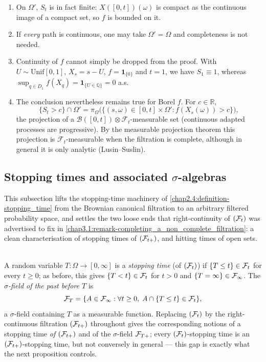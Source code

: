 \begin{remark}
\leavevmode
\begin{enumerate}
  \item On $\Omega'$, $S_t$ is in fact finite: $X([0,t])(\omega)$ is compact as
        the continuous image of a compact set, so $f$ is bounded on it.
  \item If \emph{every} path is continuous, one may take $\Omega'=\Omega$ and
        completeness is not needed.
  \item Continuity of $f$ cannot simply be dropped from the proof.
        With $U\sim\mathrm{Unif}[0,1]$, $X_s=s-U$, $f=\mathbf 1_{\{0\}}$ and
        $t=1$, we have $S_1\equiv 1$, whereas
        $\sup_{q\in D_1}f(X_q)=\mathbf 1_{\{U\in\mathbb Q\}}=0$ a.s.
  \item The conclusion nevertheless remains true for Borel $f$. For
        $c\in\mathbb R$,
        \[
          \{S_t>c\}\cap\Omega'
          =\pi_\Omega\bigl(\{(s,\omega)\in[0,t]\times\Omega' :
             f(X_s(\omega))>c\}\bigr),
        \]
        the projection of a $\mathcal B([0,t])\otimes\mathcal F_t$-measurable
        set (continuous adapted processes are progressive). By the measurable
        projection theorem this projection is $\mathcal F_t$-measurable when the
        filtration is complete, although in general it is only analytic
        (Lusin--Suslin).
\end{enumerate}
\end{remark}

\subsection{Stopping times and associated \texorpdfstring{$\sigma$}{sigma}-algebras}
This subsection lifts the stopping-time machinery of \cref{chap2.4:definition-stopping_time} from the Brownian canonical filtration to an arbitrary filtered probability space, and settles the two loose ends that right-continuity of $(\mathcal{F}_t)$ was advertised to fix in \cref{chap3.1:remark-completing_a_non_complete_filtration}: a clean characterisation of stopping times of $(\mathcal{F}_{t+})$, and hitting times of open sets.

\begin{definition} \label{chap3.2:definition-stopping_time}  \\
A random variable $T:\Omega\to[0,\infty]$ is a \textit{stopping time} (of $(\mathcal{F}_t)$) if $\{T\le t\}\in\mathcal{F}_t$ for every $t\ge0$; as before, this gives $\{T<t\}\in\mathcal{F}_t$ for $t>0$ and $\{T=\infty\}\in\mathcal{F}_\infty$. The \textit{$\sigma$-field of the past before $T$} is
$$\mathcal{F}_T=\{A\in\mathcal{F}_\infty: \forall t\ge0,\; A\cap\{T\le t\}\in\mathcal{F}_t\},$$
a $\sigma$-field containing $T$ as a measurable function. Replacing $(\mathcal{F}_t)$ by the right-continuous filtration $(\mathcal{F}_{t+})$ throughout gives the corresponding notions of a stopping time \textit{of $(\mathcal{F}_{t+})$} and of the $\sigma$-field $\mathcal{F}_{T+}$; every $(\mathcal{F}_t)$-stopping time is an $(\mathcal{F}_{t+})$-stopping time, but not conversely in general --- this gap is exactly what the next proposition controls.
\end{definition}

